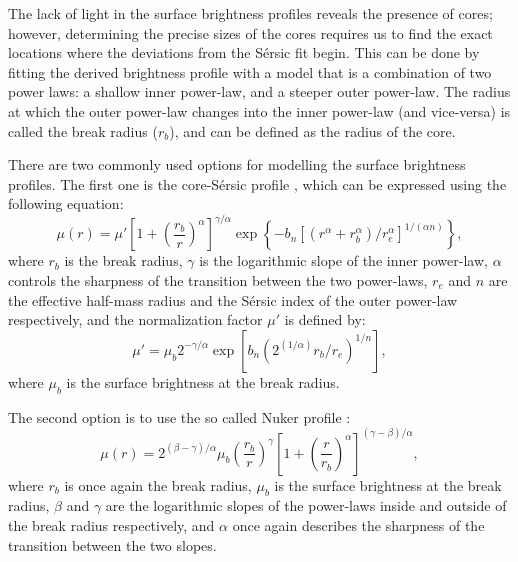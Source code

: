 \documentclass[english, oneside]{HYgradu}
\begin{document}
The lack of light in the surface brightness profiles reveals the presence of cores; however, determining the precise sizes of the cores requires us to find the exact locations where the deviations from the Sérsic fit begin. This can be done by fitting the derived brightness profile with a model that is a combination of two power laws: a shallow inner power-law, and a steeper outer power-law. The radius at which the outer power-law changes into the inner power-law (and vice-versa) is called the break radius ($r_b$), and can be defined as the radius of the core. 

There are two commonly used options for modelling the surface brightness profiles. The first one is the core-Sérsic profile \citep{Graham2003}, which can be expressed using the following equation:
\begin{equation}
\mu(r) = \mu' \left[ 1 + \left( \frac{r_b}{r} \right)^\alpha \right]^{\gamma / \alpha} \exp \left\lbrace -b_n \left[ \left( r^\alpha + r_b^\alpha \right) / r_e^\alpha \right]^{1/(\alpha n)} \right\rbrace, \label{eq:core-sersic}
\end{equation}
where $r_b$ is the break radius, $\gamma$ is the logarithmic slope of the inner power-law, $\alpha$ controls the sharpness of the transition between the two power-laws, $r_e$ and $n$ are the effective half-mass radius and the Sérsic index of the outer power-law respectively, and the normalization factor $\mu'$ is defined by:
\begin{equation}
\mu' = \mu_b 2^{-\gamma/\alpha} \exp \left[ b_n \left( 2^{(1/\alpha)} r_b/r_e \right)^{1/n} \right], 
\label{eq:mu_dot}
\end{equation}
where $\mu_b$ is the surface brightness at the break radius. 

The second option is to use the so called Nuker profile \citep{Lauer1995}:
\begin{equation}
\mu(r) = 2^{(\beta - \gamma) / \alpha} \mu_b \left( \frac{r_b}{r} \right)^\gamma \left[ 1 + \left( \frac{r}{r_b} \right)^\alpha \right]^{(\gamma - \beta)/\alpha},
\label{eq:nuker}
\end{equation}
where $r_b$ is once again the break radius, $\mu_b$ is the surface brightness at the break radius, $\beta$ and $\gamma$ are the logarithmic slopes of the power-laws inside and outside of the break radius respectively, and $\alpha$ once again describes the sharpness of the transition between the two slopes.
\end{document}
